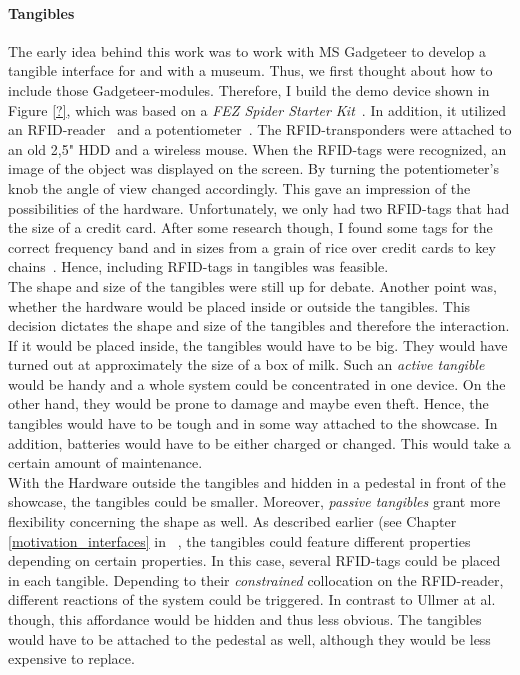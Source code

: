 \paragraph{Tangibles} 

The early idea behind this work was to work with \ac{MS} Gadgeteer to develop a tangible interface for and with a museum. Thus, we first thought about how to include those Gadgeteer-modules. Therefore, I build the demo device shown in Figure \ref{?}, which was based on a \textit{FEZ Spider Starter Kit}~\cite{SpiderKitGHI}. In addition, it utilized an \ac{RFID}-reader~\cite{RFIDreaderGHI} and a potentiometer~\cite{PotentiometerGHI}. The RFID-transponders were attached to an old 2,5" \ac{HDD} and a wireless mouse. When the \ac{RFID}-tags were recognized, an image of the object was displayed on the screen. By turning the potentiometer's knob the angle of view changed accordingly. This gave an impression of the possibilities of the hardware. Unfortunately, we only had two \ac{RFID}-tags that had the size of a credit card. After some research though, I found some tags for the correct frequency band and in sizes from a grain of rice over credit cards to key chains~\cite{RFIDtransponder}. Hence, including \ac{RFID}-tags in tangibles was feasible. 
\\
The shape and size of the tangibles were still up for debate. Another point was, whether the hardware would be placed inside or outside the tangibles. This decision dictates the shape and size of the tangibles and therefore the interaction. If it would be placed inside, the tangibles would have to be big. They would have turned out at approximately the size of a box of milk. Such an \textit{active tangible} would be handy and a whole system could be concentrated in one device. On the other hand, they would be prone to damage and maybe even theft. Hence, the tangibles would have to be tough and in some way attached to the showcase. In addition, batteries would have to be either charged or changed. This would take a certain amount of maintenance.
\\
With the Hardware outside the tangibles and hidden in a pedestal in front of the showcase, the tangibles could be smaller. Moreover, \textit{passive tangibles} grant more flexibility concerning the shape as well. As described earlier (see Chapter \ref{motivation_interfaces} in ~\cite{TangibleUI}, the tangibles could feature different properties depending on certain properties. In this case, several \ac{RFID}-tags could be placed in each tangible. Depending to their \textit{constrained} collocation on the \ac{RFID}-reader, different reactions of the system could be triggered. In contrast to Ullmer at al. though, this affordance would be hidden and thus less obvious. The tangibles would have to be attached to the pedestal as well, although they would be less expensive to replace.

